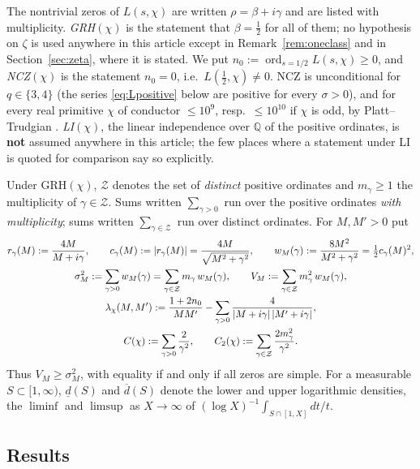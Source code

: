 \documentclass[11pt]{amsart}
\theoremstyle{definition}
\numberwithin{equation}{section}
\newcommand{\cZ}{\mathcal Z}          %
\newcommand{\dlow}{\underline{d}}
\newcommand{\dup}{\overline{d}}
\begin{document}
The nontrivial zeros of $L(s,\chi)$ are written $\rho=\beta+i\gamma$
and are listed with multiplicity. \emph{GRH$(\chi)$} is the statement
that $\beta=\tfrac12$ for all of them; no hypothesis on $\zeta$ is
used anywhere in this article except in
Remark~\ref{rem:oneclass} and in Section~\ref{sec:zeta}, where it is
stated. We put
$n_0:=\operatorname{ord}_{s=1/2}L(s,\chi)\ge0$, and
\emph{NCZ$(\chi)$} is the statement $n_0=0$, i.e.\
$L(\tfrac12,\chi)\ne0$. NCZ is unconditional for $q\in\{3,4\}$ (the
series \eqref{eq:Lpositive} below are positive for every $\sigma>0$),
and for every real primitive $\chi$ of conductor $\le10^9$, resp.\
$\le10^{10}$ if $\chi$ is odd, by Platt--Trudgian
\cite[Theorem~1]{PT26}. \emph{LI$(\chi)$}, the linear independence
over $\mathbb Q$ of the positive ordinates, is \textbf{not} assumed
anywhere in this article; the few places where a statement under LI
is quoted for comparison say so explicitly.

Under GRH$(\chi)$, $\cZ$ denotes the set of \emph{distinct} positive
ordinates and $m_\gamma\ge1$ the multiplicity of $\gamma\in\cZ$. Sums
written $\sum_{\gamma>0}$ run over the positive ordinates \emph{with
multiplicity}; sums written $\sum_{\gamma\in\cZ}$ run over distinct
ordinates. For $M,M'>0$ put
\begin{gather}
r_\gamma(M):=\frac{4M}{M+i\gamma},\qquad
c_\gamma(M):=|r_\gamma(M)|=\frac{4M}{\sqrt{M^2+\gamma^2}},\qquad
w_M(\gamma):=\frac{8M^2}{M^2+\gamma^2}=\tfrac12c_\gamma(M)^2,
\notag\\
\sigma_M^2:=\sum_{\gamma>0}w_M(\gamma)=\sum_{\gamma\in\cZ}m_\gamma\,
w_M(\gamma),\qquad
V_M:=\sum_{\gamma\in\cZ}m_\gamma^2\,w_M(\gamma),
\label{eq:defV}\\
\lambda_\chi(M,M'):=\frac{1+2n_0}{MM'}
-\sum_{\gamma>0}\frac{4}{|M+i\gamma|\,|M'+i\gamma|},
\label{eq:deflambda}\\
C(\chi):=\sum_{\gamma>0}\frac{2}{\gamma^2},\qquad
C_2(\chi):=\sum_{\gamma\in\cZ}\frac{2m_\gamma^2}{\gamma^2}.\notag
\end{gather}
Thus $V_M\ge\sigma_M^2$, with equality if and only if all zeros are
simple. For a measurable $S\subset[1,\infty)$, $\dlow(S)$ and
$\dup(S)$ denote the lower and upper logarithmic densities, the
$\liminf$ and $\limsup$ as $X\to\infty$ of
$(\log X)^{-1}\int_{S\cap[1,X]}dt/t$.

\subsection{Results}\label{subsec:results}
\end{document}
